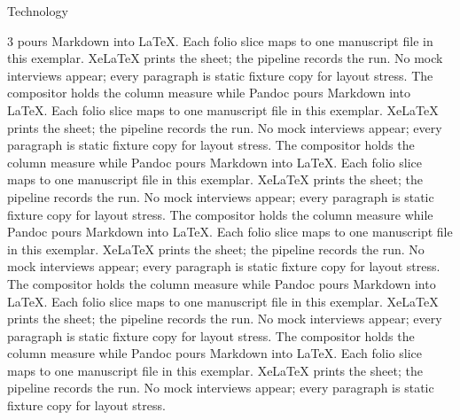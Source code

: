 \documentclass[
  ignorenonframetext,
]{beamer}
\begin{document}
\begin{frame}{Technology}
\begin{multicols}{3}
pours Markdown into LaTeX. Each folio slice maps to one manuscript file
in this exemplar. XeLaTeX prints the sheet; the pipeline records the
run. No mock interviews appear; every paragraph is static fixture copy
for layout stress. The compositor holds the column measure while Pandoc
pours Markdown into LaTeX. Each folio slice maps to one manuscript file
in this exemplar. XeLaTeX prints the sheet; the pipeline records the
run. No mock interviews appear; every paragraph is static fixture copy
for layout stress. The compositor holds the column measure while Pandoc
pours Markdown into LaTeX. Each folio slice maps to one manuscript file
in this exemplar. XeLaTeX prints the sheet; the pipeline records the
run. No mock interviews appear; every paragraph is static fixture copy
for layout stress. The compositor holds the column measure while Pandoc
pours Markdown into LaTeX. Each folio slice maps to one manuscript file
in this exemplar. XeLaTeX prints the sheet; the pipeline records the
run. No mock interviews appear; every paragraph is static fixture copy
for layout stress. The compositor holds the column measure while Pandoc
pours Markdown into LaTeX. Each folio slice maps to one manuscript file
in this exemplar. XeLaTeX prints the sheet; the pipeline records the
run. No mock interviews appear; every paragraph is static fixture copy
for layout stress. The compositor holds the column measure while Pandoc
pours Markdown into LaTeX. Each folio slice maps to one manuscript file
in this exemplar. XeLaTeX prints the sheet; the pipeline records the
run. No mock interviews appear; every paragraph is static fixture copy
for layout stress.

\end{multicols}
\end{frame}
\end{document}
